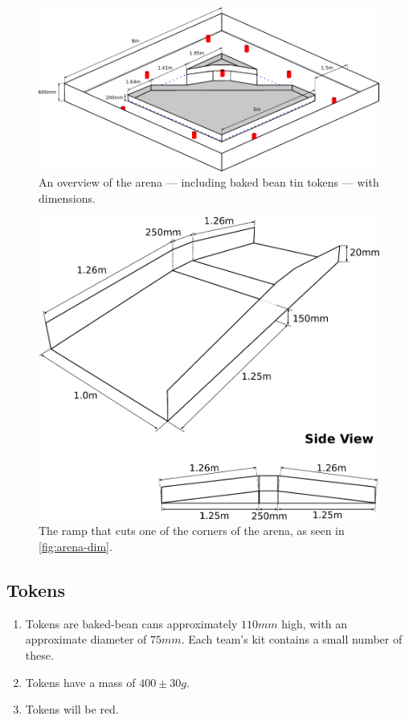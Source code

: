 \begin{figure}
  \includegraphics[keepaspectratio, clip, width=\textwidth]{./images/sr2011-arena.pdf}
  \caption{\label{fig:arena-dim}An overview of the arena --- including baked bean tin tokens --- with dimensions.}
\end{figure}

\begin{figure}
  \begin{center}
    \includegraphics[keepaspectratio,width=\textwidth]{./images/ramp-2011.pdf}
  \end{center}
  \caption{\label{fig:ramp-on-its-own}The ramp that cuts one of the corners of the arena, as seen in \autoref{fig:arena-dim}.}
\end{figure}

\subsection{Tokens}
\label{sub:Tokens}
\begin {enumerate}
\item Tokens are baked-bean cans approximately $110mm$ high, with an approximate diameter of $75mm$.
 Each team's kit contains a small number of these.
\item Tokens have a mass of $400\pm30g$.
\item Tokens will be red.
\end {enumerate}

